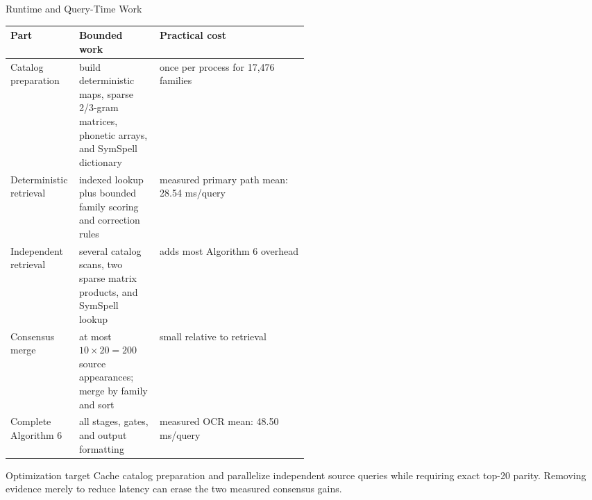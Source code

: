 \documentclass[aspectratio=169,10pt]{beamer}
\begin{document}
\begin{frame}{Runtime and Query-Time Work}
\footnotesize
\begin{tabularx}{\linewidth}{@{}L{0.23\linewidth}L{0.27\linewidth}Y@{}}
\toprule
\textbf{Part} & \textbf{Bounded work} & \textbf{Practical cost} \\
\midrule
Catalog preparation & build deterministic maps, sparse 2/3-gram matrices, phonetic arrays, and SymSpell dictionary & once per process for 17,476 families \\
Deterministic retrieval & indexed lookup plus bounded family scoring and correction rules & measured primary path mean: 28.54 ms/query \\
Independent retrieval & several catalog scans, two sparse matrix products, and SymSpell lookup & adds most Algorithm 6 overhead \\
Consensus merge & at most $10\times20=200$ source appearances; merge by family and sort & small relative to retrieval \\
Complete Algorithm 6 & all stages, gates, and output formatting & measured OCR mean: 48.50 ms/query \\
\bottomrule
\end{tabularx}

\vspace{1mm}
\begin{block}{Optimization target}
\scriptsize
Cache catalog preparation and parallelize independent source queries while
requiring exact top-20 parity. Removing evidence merely to reduce latency can
erase the two measured consensus gains.
\end{block}
\end{frame}
\end{document}
